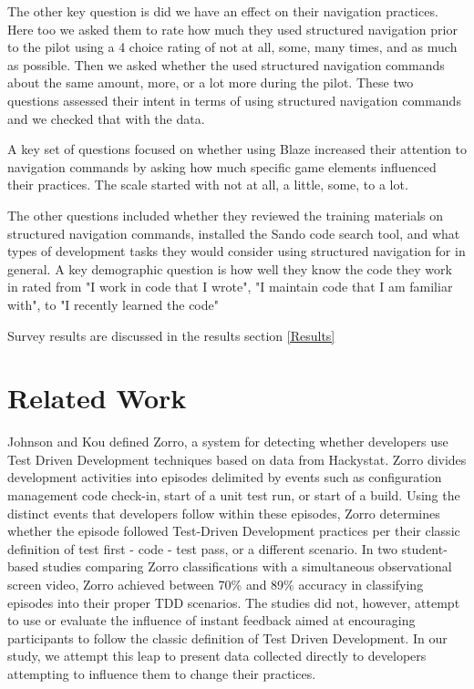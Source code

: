\documentclass{sig-alternate}
\begin{document}
The other key question is did we have an effect on their navigation practices.  Here too we asked them to rate how much they used structured navigation prior to the pilot using a 4 choice rating of not at all, some, many times, and as much as possible.  Then we asked whether the used structured navigation commands about the same amount, more,  or a lot more during the pilot.  These two questions assessed their intent in terms of using structured navigation commands and we checked that with the data.

A key set of questions focused on whether using Blaze increased their attention to navigation commands by asking how much specific game elements influenced their practices.  The scale started with not at all, a little, some, to a lot.  

The other questions included whether they reviewed the training materials on structured navigation commands, installed the Sando code search tool, and what types of development tasks they would consider using structured navigation for in general.  A key demographic question is how well they know the code they work in rated from "I work in code that I wrote", "I maintain code that I am familiar with", to "I recently learned the code"

Survey results are discussed in the results section \ref{Results}

\section{Related Work}

Johnson and Kou defined Zorro\cite{V:Johnson2007Automated}, a system for detecting whether developers use Test Driven Development techniques based on data from Hackystat.  Zorro divides development activities into episodes delimited by events such as configuration management code check-in, start of a unit test run, or start of a build.  Using the distinct events that developers follow within these episodes, Zorro determines whether the episode followed Test-Driven Development practices per their classic definition of test first - code - test pass, or a different scenario.  In two student-based studies comparing Zorro classifications with a simultaneous observational screen video, Zorro achieved between 70\% \cite{Kou2010Operational} and 89\% \cite{V:Johnson2007Automated} accuracy in classifying episodes into their proper TDD scenarios.  The studies did not, however, attempt to use or evaluate the influence of instant feedback aimed at encouraging participants to follow the classic definition of Test Driven Development.  In our study, we attempt this leap to present data collected directly to developers attempting to influence them to change their practices.
\end{document}
